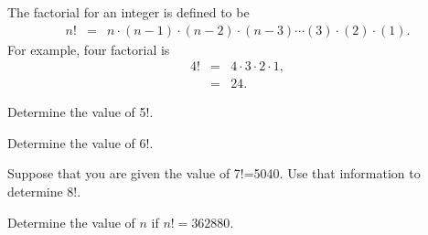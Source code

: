 
\begin{problem}
\item The factorial for an integer is defined to be 
  \begin{eqnarray*}
    n! & = & n \cdot (n-1) \cdot (n-2) \cdot (n-3) \cdots (3) \cdot (2) \cdot (1).
  \end{eqnarray*}
  For example, four factorial is 
  \begin{eqnarray*}
    4! & = & 4 \cdot 3 \cdot 2 \cdot 1, \\
       & = & 24.
  \end{eqnarray*}

  \begin{subproblem}
  \item Determine the value of 5!.
    \vfill
  \item Determine the value of 6!.
    \vfill
  \item Suppose that you are given the value of 7!=5040. Use that
    information to determine 8!.
    \vfill
  \item Determine the value of $n$ if $n!=362880$.
    \vfill
  \end{subproblem}
\end{problem}


